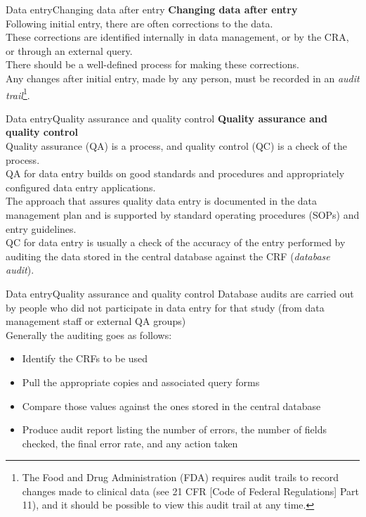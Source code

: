 \documentclass[xcolor=dvipsnames,11pt]{beamer}
\begin{document}
\begin{frame}[fragile]{Data entry}{Changing data after entry}
	\textbf{Changing data after entry}\\
	\bigskip
	Following initial entry, there are often corrections to the data.\\
	\bigskip
	These corrections are identified internally in data management, or by the CRA, or through an external query.\\
	\bigskip
	There should be a well-defined process for making these corrections.\\
	\bigskip
	Any changes after initial entry, made by any person, must be recorded in an \textcolor{PineGreen}{\textit{audit trail}}\footnote{The Food and Drug Administration (FDA) requires audit trails to record changes made to clinical data (see 21 CFR [Code of Federal Regulations] Part 11), and it should be possible to view this audit trail at any time.}.\\
	
\end{frame}

\begin{frame}[fragile]{Data entry}{Quality assurance and quality control}
	\textbf{Quality assurance and quality control}\\
	\bigskip
	Quality assurance (QA) is a process, and quality control (QC) is a check of the process.\\
	\bigskip
	QA for data entry builds on good standards and procedures and appropriately configured data entry applications.\\
	\bigskip
	The approach that assures quality data entry is documented in the data management plan and is supported by standard operating procedures (SOPs) and entry guidelines.\\
	\bigskip
	QC for data entry is usually a check of the accuracy of the entry performed by auditing the data stored in the central database against the CRF (\textcolor{PineGreen}{\textit{database audit}}).
	
\end{frame}

\begin{frame}[fragile]{Data entry}{Quality assurance and quality control}
	Database audits are carried out by people who did not participate in data entry for that study (from data management staff or external QA groups)\\
	\bigskip
	Generally the auditing goes as follows:
	\begin{itemize}
		\item Identify the CRFs to be used
		\item Pull the appropriate copies and associated query forms
		\item Compare those values against the ones stored in the central database
		\item Produce audit report listing the number of errors, the number of fields checked, the final error rate, and any action taken
	\end{itemize}
\end{frame}
\end{document}

